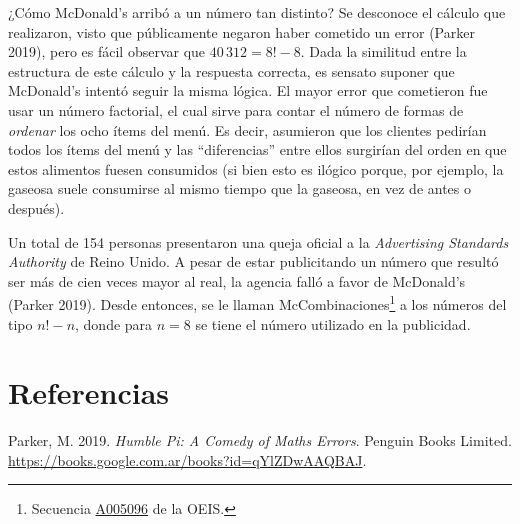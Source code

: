 \documentclass[
  letterpaper,
  DIV=11,
  numbers=noendperiod]{scrreprt}
\newlength{\cslhangindent}
\newlength{\cslentryspacingunit} %
\newenvironment{CSLReferences}[2] %
 {%
  \setlength{\parindent}{0pt}
  \ifodd #1
  \let\oldpar\par
  \def\par{\hangindent=\cslhangindent\oldpar}
  \fi
  \setlength{\parskip}{#2\cslentryspacingunit}
 }%
 {}
\begin{document}
¿Cómo McDonald's arribó a un número tan distinto? Se desconoce el
cálculo que realizaron, visto que públicamente negaron haber cometido un
error (Parker 2019), pero es fácil observar que \(40\,312 = 8! - 8.\)
Dada la similitud entre la estructura de este cálculo y la respuesta
correcta, es sensato suponer que McDonald's intentó seguir la misma
lógica. El mayor error que cometieron fue usar un número factorial, el
cual sirve para contar el número de formas de \emph{ordenar} los ocho
ítems del menú. Es decir, asumieron que los clientes pedirían todos los
ítems del menú y las ``diferencias'' entre ellos surgirían del orden en
que estos alimentos fuesen consumidos (si bien esto es ilógico porque,
por ejemplo, la gaseosa suele consumirse al mismo tiempo que la gaseosa,
en vez de antes o después).

Un total de 154 personas presentaron una queja oficial a la
\emph{Advertising Standards Authority} de Reino Unido. A pesar de estar
publicitando un número que resultó ser más de cien veces mayor al real,
la agencia falló a favor de McDonald's (Parker 2019). Desde entonces, se
le llaman McCombinaciones\footnote{Secuencia
  \href{https://oeis.org/A005096/internal}{A005096} de la OEIS.} a los
números del tipo \(n!-n\), donde para \(n=8\) se tiene el número
utilizado en la publicidad.


\hypertarget{referencias}{%
\chapter*{Referencias}\label{referencias}}


\hypertarget{refs}{}
\begin{CSLReferences}{1}{0}
\leavevmode{}%
Parker, M. 2019. \emph{Humble Pi: A Comedy of Maths Errors}. Penguin
Books Limited. \url{https://books.google.com.ar/books?id=qYlZDwAAQBAJ}.

\end{CSLReferences}
\end{document}
